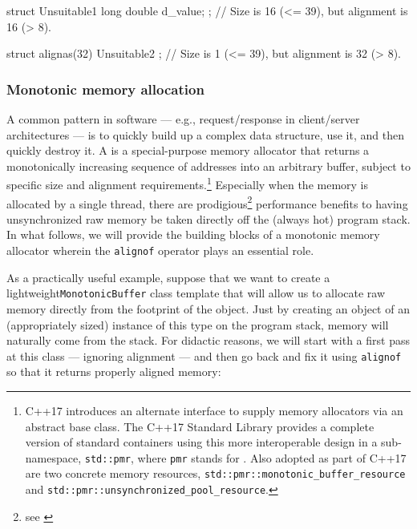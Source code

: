 \begin{emcppslisting}
struct Unsuitable1 { long double d_value; };
    // Size is 16 (<= 39), but alignment is 16 (> 8).

struct alignas(32) Unsuitable2 { };
    // Size is  1 (<= 39), but alignment is 32 (> 8).
\end{emcppslisting}

\subsubsection[Monotonic memory allocation]{Monotonic memory allocation}\label{monotonic-memory-allocation}

A common pattern in software --- e.g., request/response in client/server
architectures --- is to quickly build up a complex data structure,
use it, and then quickly destroy it. A  is
a special-purpose memory allocator that returns a monotonically
increasing sequence of addresses into an arbitrary buffer, subject to
specific size and alignment requirements.{\cprotect\footnote{C++17
introduces an alternate interface to supply memory allocators via an
abstract base class. The C++17 Standard Library provides a complete
version of standard containers using this more interoperable design in
a sub-namespace, \lstinline!std::pmr!, where \lstinline!pmr! stands for
. Also adopted as part of C++17
are two concrete memory resources,
\lstinline!std::pmr::monotonic_buffer_resource! and
  \lstinline!std::pmr::unsynchronized_pool_resource!.}} Especially when
the memory is allocated by a single thread, there are prodigious\footnote{see
\cite{lakos16}} performance benefits to having unsynchronized raw
memory be taken directly off the (always hot) program stack. In what
follows, we will provide the building blocks of a monotonic memory
allocator wherein the \lstinline!alignof! operator plays an essential role.

As a practically useful example, suppose that we want to create a
lightweight\linebreak[4] \mbox{\lstinline!MonotonicBuffer!} class template that will allow us
to allocate raw memory directly from the footprint of the object. Just
by creating an object of an (appropriately sized) instance of this type
on the program stack, memory will naturally come from the stack. For
didactic reasons, we will start with a first pass at this class ---
ignoring alignment --- and then go back and fix it using
\lstinline!alignof! so that it returns properly aligned memory:

